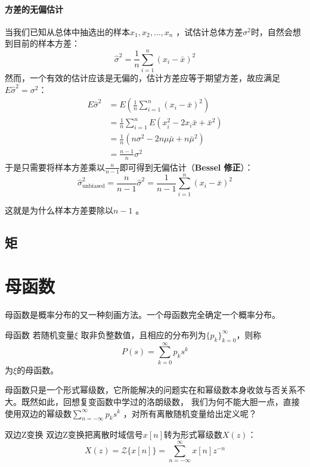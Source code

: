 \paragraph{方差的无偏估计}

当我们已知从总体中抽选出的样本\(x_1, x_2, \ldots, x_n\) ，试估计总体方差\(\sigma^2\)时，自然会想到目前的样本方差：
\[
    \hat{\sigma}^{2}= \frac{1}{n} \sum_{i=1}^{n} (x_i - \bar{x})^2
\]
然而，一个有效的估计应该是无偏的，估计方差应等于期望方差，故应满足\(E \hat{\sigma}^{2} = \sigma^{2}\)：
\begin{align*}
    E \hat{\sigma}^{2} &= E\left( \frac{1}{n} \sum_{i=1}^{n} (x_i -
    \bar{x})^2 \right)\\
    &= \frac{1}{n} \sum_{i=1}^{n} E\left( x_i^2 - 2x_i\bar{x} +
    \bar{x}^2 \right)\\
    &= \frac{1}{n} \left( n\sigma^2 - 2n\mu\bar{\mu} + n\bar{\mu}^2 \right)\\
    &= \frac{n-1}{n} \sigma^2
\end{align*}
于是只需要将样本方差乘以\(\frac{n}{n-1}\)即可得到无偏估计（\textbf{Bessel 修正}）：
\[
    \hat{\sigma}^{2}_{\text{unbiased}} = \frac{n}{n-1}
    \hat{\sigma}^{2} = \frac{1}{n-
    1} \sum_{i=1}^{n} (x_i - \bar{x})^2
\]

这就是为什么样本方差要除以\(n-1\) 。

\subsection{矩}
\section{母函数}
母函数是概率分布的又一种刻画方法。一个母函数完全确定一个概率分布。
\begin{definition}{母函数}
    若随机变量\(\xi\) 取非负整数值，且相应的分布列为\(\{p_k\}_{k=0}^{\infty}\)，则称
    \[
        P(s) = \sum_{k=0}^{\infty} p_k s^{k}
    \]
    为\(\xi\)的母函数。
\end{definition}

母函数只是一个形式幂级数，它所能解决的问题实在和幂级数本身收敛与否关系不大。既然如此，回想复变函数中学过的洛朗级数，
我们为何不能大胆一点，直接使用双边的幂级数\(\sum_{n=-\infty}^{\infty} p_{k}s^{k}
\) ，对所有离散随机变量给出定义呢？

\begin{definition}{双边Z变换}
    双边Z变换把离散时域信号\(x[n]\)转为形式幂级数\(X(z)\)：
    \[
        X(z) = \mathcal{Z}\{x[n]\} =\sum_{n=-\infty}^{\infty}
        x[n] z^{-n}
    \]
\end{definition}

